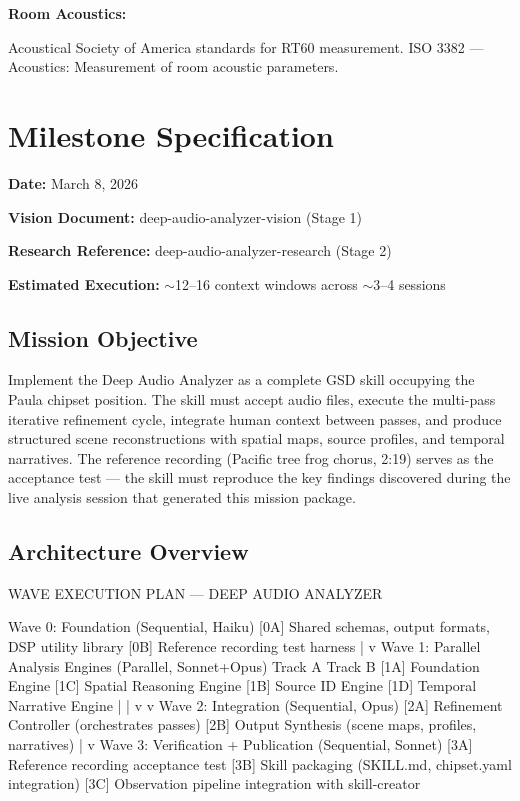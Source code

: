 \documentclass[11pt,letterpaper]{article}
\newcommand{\stageheader}[2]{%
  \noindent\colorbox{#2}{\makebox[\textwidth][l]{%
    \textcolor{white}{\bfseries\sffamily\hspace{6pt}#1\hspace{6pt}}}}%
  \vspace{0.5em}\par%
}
\newcommand{\metafield}[2]{\textbf{\sffamily #1} #2\par}
\begin{document}
\textbf{Room Acoustics:}

Acoustical Society of America standards for RT60 measurement. ISO 3382 --- Acoustics: Measurement of room acoustic parameters.

\newpage

\stageheader{STAGE 3 --- MISSION PACKAGE}{tertiary}

\section{Milestone Specification}

\metafield{Date:}{March 8, 2026}
\metafield{Vision Document:}{deep-audio-analyzer-vision (Stage 1)}
\metafield{Research Reference:}{deep-audio-analyzer-research (Stage 2)}
\metafield{Estimated Execution:}{$\sim$12--16 context windows across $\sim$3--4 sessions}

\subsection{Mission Objective}

Implement the Deep Audio Analyzer as a complete GSD skill occupying the Paula chipset position. The skill must accept audio files, execute the multi-pass iterative refinement cycle, integrate human context between passes, and produce structured scene reconstructions with spatial maps, source profiles, and temporal narratives. The reference recording (Pacific tree frog chorus, 2:19) serves as the acceptance test --- the skill must reproduce the key findings discovered during the live analysis session that generated this mission package.

\subsection{Architecture Overview}

\begin{asciibox}
WAVE EXECUTION PLAN — DEEP AUDIO ANALYZER

Wave 0: Foundation (Sequential, Haiku)
  [0A] Shared schemas, output formats, DSP utility library
  [0B] Reference recording test harness
        |
        v
Wave 1: Parallel Analysis Engines (Parallel, Sonnet+Opus)
  Track A                    Track B
  [1A] Foundation Engine     [1C] Spatial Reasoning Engine
  [1B] Source ID Engine      [1D] Temporal Narrative Engine
        |                          |
        v                          v
Wave 2: Integration (Sequential, Opus)
  [2A] Refinement Controller (orchestrates passes)
  [2B] Output Synthesis (scene maps, profiles, narratives)
        |
        v
Wave 3: Verification + Publication (Sequential, Sonnet)
  [3A] Reference recording acceptance test
  [3B] Skill packaging (SKILL.md, chipset.yaml integration)
  [3C] Observation pipeline integration with skill-creator
\end{asciibox}
\end{document}

